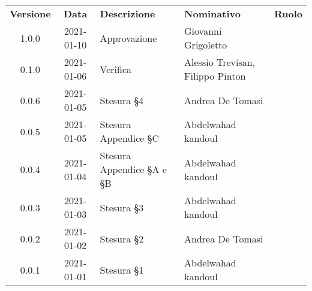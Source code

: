 {
    \renewcommand{\arraystretch}{1.5}
    \centering
    \begin{longtable}{ c c  C{3.5cm}  C{4cm}  c }
        \rowcolor{\primaryColor}
        \textcolor{\secondaryColor}{
        \textbf{Versione}}     & \textcolor{\secondaryColor}{\textbf{Data}}       & \textcolor{\secondaryColor}
        {\textbf{Descrizione}} & \textcolor{\secondaryColor}{\textbf{Nominativo}} & \textcolor{\secondaryColor}{\textbf{Ruolo}}                          \\


        1.0.0                   &2021-01-10                                        & Approvazione                                   &Giovanni Grigoletto & \responsabile{}\\
        0.1.0                  & 2021-01-06                                       & Verifica                            & Alessio Trevisan, Filippo Pinton &\verificatore{}\\
        0.0.6                   &2021-01-05                                        & Stesura §4                              & Andrea De Tomasi & \verificatore{} \\
        0.0.5                  & 2021-01-05                                       & Stesura Appendice §C                         & Abdelwahad kandoul & \verificatore{} \\
        0.0.4                  & 2021-01-04                                       & Stesura Appendice §A e §B                          & Abdelwahad kandoul & \verificatore{} \\
        0.0.3                  & 2021-01-03                                       & Stesura §3                            & Abdelwahad kandoul & \verificatore{} \\
        0.0.2                  & 2021-01-02                                       & Stesura §2                              & Andrea De Tomasi & \verificatore{} \\
        0.0.1                  & 2021-01-01                                       & Stesura §1                            & Abdelwahad kandoul & \verificatore{} \\
    
    
    \end{longtable}
}
